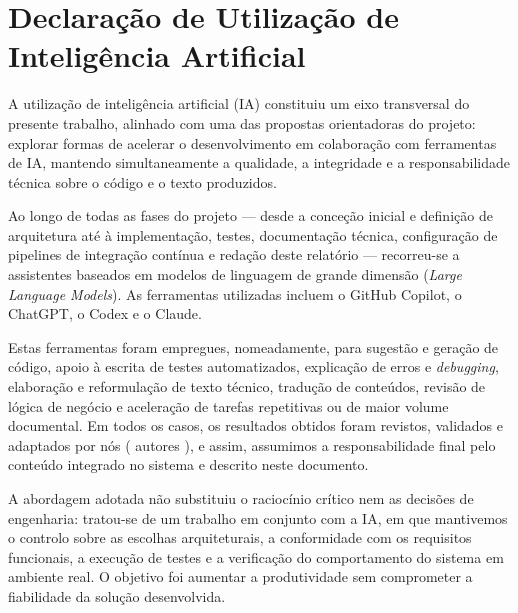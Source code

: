 
\chapter{Declaração de Utilização de Inteligência Artificial}
\label{chap:declaracao-ia}

A utilização de inteligência artificial (IA) constituiu um eixo transversal do presente trabalho, alinhado com uma das propostas orientadoras do projeto: explorar formas de acelerar o desenvolvimento em colaboração com ferramentas de IA, mantendo simultaneamente a qualidade, a integridade e a responsabilidade técnica sobre o código e o texto produzidos.

Ao longo de todas as fases do projeto — desde a conceção inicial e definição de arquitetura até à implementação, testes, documentação técnica, configuração de pipelines de integração contínua e redação deste relatório — recorreu-se a assistentes baseados em modelos de linguagem de grande dimensão (\textit{Large Language Models}). As ferramentas utilizadas incluem o GitHub Copilot, o ChatGPT, o Codex e o Claude.

Estas ferramentas foram empregues, nomeadamente, para sugestão e geração de código, apoio à escrita de testes automatizados, explicação de erros e \textit{debugging}, elaboração e reformulação de texto técnico, tradução de conteúdos, revisão de lógica de negócio e aceleração de tarefas repetitivas ou de maior volume documental. Em todos os casos, os resultados obtidos foram revistos, validados e adaptados por nós ( autores ), e assim, assumimos a responsabilidade final pelo conteúdo integrado no sistema e descrito neste documento.

A abordagem adotada não substituiu o raciocínio crítico nem as decisões de engenharia: tratou-se de um trabalho em conjunto com a IA, em que mantivemos o controlo sobre as escolhas arquiteturais, a conformidade com os requisitos funcionais, a execução de testes e a verificação do comportamento do sistema em ambiente real. O objetivo foi aumentar a produtividade sem comprometer a fiabilidade da solução desenvolvida.
